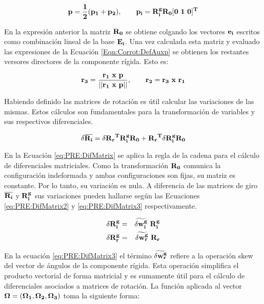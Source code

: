 \begin{equation}\label{Eqn:Corrot:DefAuxp}
	\bf{p}=\frac{1}{2}(\bf{p}_1+\bf{p}_2),~~~~~~\bf{p_i}=\bf{R}_i^g\bf{R}_0[0~1~0]^T
\end{equation}

En la expresión anterior la matriz $\bf{R}_0$ se obtiene colgando los vectores $\bf{e}_i$ escritos como combinación lineal de la base $\bf{E_i}$. Una vez calculada esta matriz y evaluado las expresiones de la Ecuación \eqref{Eqn:Corrot:DefAuxp} se obtienen los restantes versores directores 
de la componente rígida. Esto es:


\begin{equation}\label{Eqn:Corrot:VectorsR}
	\bf{r}_3=\frac{\bf{r_1}~x~\bf{p}}{||\bf{r_1}~x~\bf{p}||},~~~~~~\bf{r_2}=\bf{r_3}~x~\bf{r_1}
\end{equation}


Habiendo definido las matrices de rotación  es útil calcular las variaciones de las mismas. Estos cálculos son fundamentales para la transformación de variables y sus respectivos diferenciales. 

\begin{equation}\label{eq:PRE:DifMatrix}
	\delta \overline{\bf{R_i}}=\delta\bf{R_r}^T\bf{R_i^g}\bf{R_0}+\bf{R_r}^T\delta \bf{R_i^g}\bf{R_0}
\end{equation}

En la Ecuación \eqref{eq:PRE:DifMatrix} se aplica la regla de la cadena para el cálculo de diferenciales matriciales. Como la transformación $\bf{R_0}$ comunica la configuración indeformada y ambas configuraciones son fijas, su matriz es constante. Por lo tanto, su variación es nula. A diferencia de las matrices de giro $\overline{\bf{R_i}}$ y $ \bf{R_i^g}$ sus variaciones pueden hallarse según las Ecuaciones \eqref{eq:PRE:DifMatrix2} y \eqref{eq:PRE:DifMatrix3} respectivamente.


\begin{eqnarray}
	\label{eq:PRE:DifMatrix2}
	\delta \bf{R_i^g} &=& \widetilde{\delta\bf{w}_i^g}~\bf{R}_i^g\\
	\label{eq:PRE:DifMatrix3}
	\delta \bf{R_r^g} &=& \widetilde{\delta\bf{w}_r^g}~\bf{R}_r
\end{eqnarray}

En la ecuación \eqref{eq:PRE:DifMatrix3} el término $\widetilde{\delta\bf{w}_r^g}$ refiere a la operación skew del vector de ángulos de la componente rígida. Esta operación simplifica el producto vectorial de forma matricial y es sumamente útil para el cálculo de diferenciales asociados a matrices de rotación. La función aplicada al vector $\bf{\Omega}=(\Omega_1,\Omega_2,\Omega_3)$ toma la siguiente forma:

